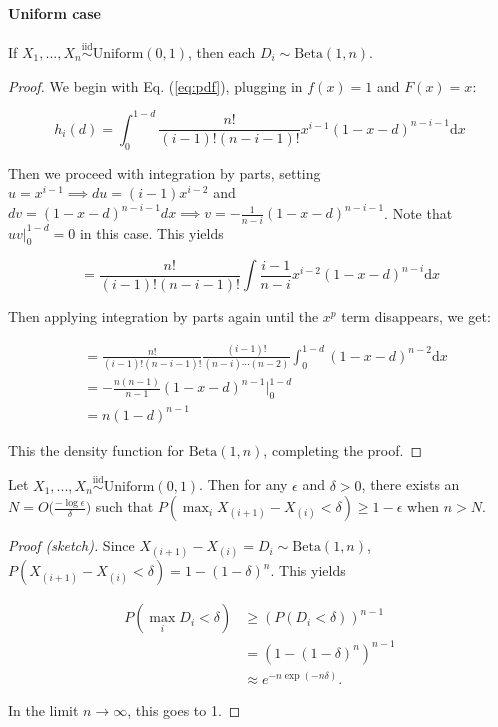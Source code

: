 \documentclass[12pt]{article}
\begin{document}
\hypertarget{uniform-case}{%
\paragraph{Uniform case}\label{uniform-case}}

\begin{lemma}
If $X_1, ..., X_n \stackrel{\mathrm{iid}}{\sim}\mathrm{Uniform}(0, 1)$, then each $D_i \sim \mathrm{Beta}(1, n)$.
\end{lemma}

\begin{proof}
We begin with Eq. (\ref{eq:pdf}), plugging in $f(x) = 1$ and $F(x) = x$:

$$
h_i(d) = \int_0^{1-d} \frac{n!}{(i-1)! (n-i-1)!} x^{i-1} (1-x-d)^{n-i-1} \mathrm{d}x
$$

Then we proceed with integration by parts, setting 
$u = x^{i-1} \implies du = (i-1) x^{i-2}$ and 
$dv = (1-x-d)^{n-i-1} dx \implies v = -\frac{1}{n-i} (1-x-d)^{n-i-1}$. 
Note that $u v |_0^{1-d} = 0$ in this case. This yields

$$
= \frac{n!}{(i-1)! (n-i-1)!} \int \frac{i-1}{n-i} x^{i-2} (1-x-d)^{n-i} \mathrm{d}x
$$

Then applying integration by parts again until the $x^p$ term disappears, we get:

$$
\begin{aligned}
& = \frac{n!}{(i-1)! (n-i-1)!} \frac{(i-1)!}{(n-i) \cdots (n-2)} \int_0^{1-d} (1-x-d)^{n-2} \mathrm{d}x \\
& = -\frac{n (n-1)}{n-1} (1-x-d)^{n-1} \Big|_0^{1-d} \\
& = n (1 - d)^{n-1}
\end{aligned}
$$

This the density function for $\mathrm{Beta}(1, n)$, completing the proof.
\end{proof}

\begin{theorem}
Let $X_1, ..., X_n \stackrel{\mathrm{iid}}{\sim}\mathrm{Uniform}(0, 1)$. 
Then for any $\epsilon$ and $\delta > 0$, 
there exists an $N = O \big(\frac{-\log \epsilon}{\delta} \big)$ such that 
$P(\max_i X_{(i+1)} - X_{(i)} < \delta) \geq 1 - \epsilon$ when $n > N$.
\end{theorem}

\begin{proof}[Proof (sketch)]
Since $X_{(i+1)} - X_{(i)} = D_i \sim \mathrm{Beta}(1, n)$, 
$P(X_{(i+1)} - X_{(i)} < \delta) = 1 - (1 - \delta)^n $. This yields

$$
\begin{aligned}
P(\max_i D_i < \delta) & \geq (P(D_i < \delta))^{n-1} \\
& = (1 - (1 - \delta)^n)^{n-1} \\
& \approx e^{-n \exp(-n \delta)}.
\end{aligned}
$$

In the limit $n \to \infty$, this goes to 1.
\end{proof}
\end{document}
